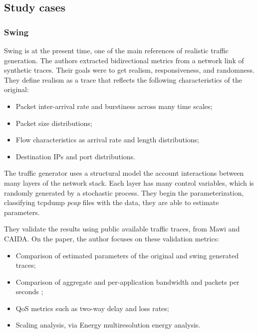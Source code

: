 \subsection{Study cases}

\subsubsection{Swing}
Swing\cite{swing-paper} is at the present time, one of the main references of realistic traffic generation.  The authors extracted bidirectional metrics from a network link of synthetic traces. Their goals were to get  realism, responsiveness, and randomness.  They define realism as a trace that reflects the following characteristics of the original: 

\begin{itemize}
\item Packet inter-arrival rate and burstiness across many time scales;
\item Packet size distributions;
\item Flow characteristics as arrival rate and length distributions;
\item Destination IPs and port distributions.
\end{itemize}

The traffic generator uses a structural model the account interactions between many layers of the network stack. Each layer has many control variables, which is randomly generated by a stochastic process.  They begin the parameterization, classifying tcpdump\cite{web-libpcap} \textit{pcap}  files with the data, they are able to estimate parameters. 

They validate the results using public available traffic traces, from Mawi\cite{web-mawi} and CAIDA\cite{web-caida}. On the paper, the author focuses on these validation metrics:

\begin{itemize}
\item Comparison of estimated parameters of the original and swing  generated traces;
\item Comparison of aggregate and per-application bandwidth and packets per seconds ;
\item QoS metrics such as two-way delay and loss rates;
\item Scaling analysis, via Energy multiresolution energy analysis.
\end{itemize}


